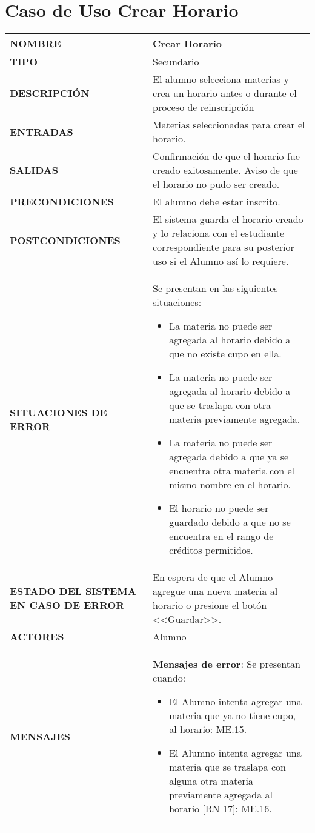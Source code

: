 \newpage
\section{Caso de Uso Crear Horario}
\begin{longtable}{ | p{6cm} | p{10cm} |}
	\hline
	\textbf{NOMBRE} & Crear Horario\\
	\hline
	\textbf{TIPO} & Secundario\\
	\hline
	\textbf{DESCRIPCIÓN} & El alumno selecciona materias y crea un horario antes o durante el proceso de reinscripción\\
	\hline
	\textbf{ENTRADAS} & Materias seleccionadas para crear el horario.\\
	\hline
	\textbf{SALIDAS} & Confirmación de que el horario fue creado exitosamente. Aviso de que el horario no pudo ser creado.\\
	\hline
	\textbf{PRECONDICIONES} & El alumno debe estar inscrito.\\
	\hline
	\textbf{POSTCONDICIONES} & El sistema guarda el horario creado y lo relaciona con el estudiante correspondiente para su posterior uso si el Alumno así lo requiere.\\
	\hline
	\textbf{SITUACIONES DE ERROR} & Se presentan en las siguientes situaciones:
	\begin{itemize}
		\item La materia no puede ser agregada al horario debido a que no existe cupo en ella. 
		\item La materia no puede ser agregada al horario debido a que se traslapa con otra materia previamente agregada.
		\item La materia no puede ser agregada debido a que ya se encuentra otra materia con el mismo nombre en el horario.
		\item El horario no puede ser guardado debido a que no se encuentra en el rango de créditos permitidos.
	\end{itemize}\\
	\hline
	\textbf{ESTADO DEL SISTEMA EN CASO DE ERROR} &  En espera de que el Alumno agregue una nueva materia al horario o presione el botón <<Guardar>>.\\
	\hline
	\textbf{ACTORES} & Alumno\\
	\hline
	\textbf{MENSAJES} & \textbf{Mensajes de error}: Se presentan cuando:
	\begin{itemize}
		\item El Alumno intenta agregar una materia que ya no tiene cupo, al horario: ME.15. 
		\item El Alumno intenta agregar una materia que se traslapa con alguna otra materia previamente agregada al horario [RN 17]: ME.16.

\end{itemize}
\end{longtable}
